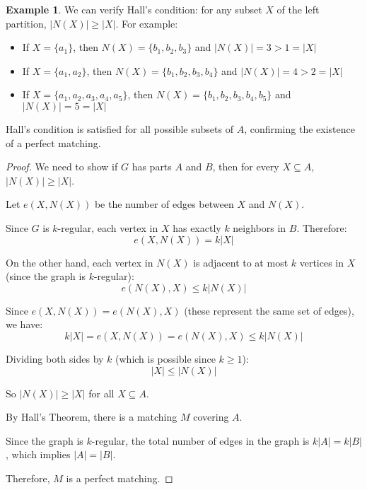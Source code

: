 \documentclass{article}
\theoremstyle{definition}
\newtheorem{example}{Example}
\begin{document}
\begin{example}
We can verify Hall's condition: for any subset $X$ of the left partition, $|N(X)| \geq |X|$. For example:
\begin{itemize}
\item If $X = \{a_1\}$, then $N(X) = \{b_1, b_2, b_3\}$ and $|N(X)| = 3 > 1 = |X|$
\item If $X = \{a_1, a_2\}$, then $N(X) = \{b_1, b_2, b_3, b_4\}$ and $|N(X)| = 4 > 2 = |X|$
\item If $X = \{a_1, a_2, a_3, a_4, a_5\}$, then $N(X) = \{b_1, b_2, b_3, b_4, b_5\}$ and $|N(X)| = 5 = |X|$
\end{itemize}

Hall's condition is satisfied for all possible subsets of $A$, confirming the existence of a perfect matching.
\end{example}

\begin{proof}
We need to show if $G$ has parts $A$ and $B$, then for every $X \subseteq A$, $|N(X)| \geq |X|$.

Let $e(X, N(X))$ be the number of edges between $X$ and $N(X)$.

Since $G$ is $k$-regular, each vertex in $X$ has exactly $k$ neighbors in $B$. Therefore:
\[e(X, N(X)) = k|X|\]

On the other hand, each vertex in $N(X)$ is adjacent to at most $k$ vertices in $X$ (since the graph is $k$-regular):
\[e(N(X), X) \leq k|N(X)|\]

Since $e(X, N(X)) = e(N(X), X)$ (these represent the same set of edges), we have:
\[k|X| = e(X, N(X)) = e(N(X), X) \leq k|N(X)|\]

Dividing both sides by $k$ (which is possible since $k \geq 1$):
\[|X| \leq |N(X)|\]

So $|N(X)| \geq |X|$ for all $X \subseteq A$.

By Hall's Theorem, there is a matching $M$ covering $A$.

Since the graph is $k$-regular, the total number of edges in the graph is $k|A| = k|B|$, which implies $|A| = |B|$.

Therefore, $M$ is a perfect matching.
\end{proof}
\end{document}
